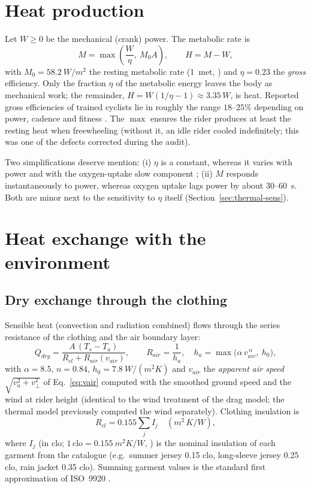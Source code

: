 \documentclass[11pt,a4paper]{article}
\begin{document}
\section{Heat production}
\label{sec:heatprod}
Let \(W\ge0\) be the mechanical (crank) power. The metabolic rate is
\begin{equation}
 M=\max\!\left(\frac{W}{\eta},\ M_0A\right),\qquad H=M-W,
 \label{eq:metab}
\end{equation}
with \(M_0=\SI{58.2}{W/m^2}\) the resting metabolic rate (1~met, \citealp{iso7730}) and \(\eta=0.23\) the \emph{gross} efficiency. Only the fraction \(\eta\) of the metabolic energy leaves the body as mechanical work; the remainder, \(H=W(1/\eta-1)\approx3.35\,W\), is heat. Reported gross efficiencies of trained cyclists lie in roughly the range \(18\)--\(25\%\) depending on power, cadence and fitness \citep{ettema2009}. The \(\max\) ensures the rider produces at least the resting heat when freewheeling (without it, an idle rider cooled indefinitely; this was one of the defects corrected during the audit).

Two simplifications deserve mention: (i) \(\eta\) is a constant, whereas it varies with power and with the oxygen-uptake slow component \citep{ettema2009}; (ii) \(M\) responds instantaneously to power, whereas oxygen uptake lags power by about \(30\)--\SI{60}{s}. Both are minor next to the sensitivity to \(\eta\) itself (Section~\ref{sec:thermal-sens}).

\section{Heat exchange with the environment}
\subsection{Dry exchange through the clothing}
\label{sec:dry}
Sensible heat (convection and radiation combined) flows through the series resistance of the clothing and the air boundary layer:
\begin{equation}
 Q_{dry}=\frac{A\,(T_s-T_a)}{R_{cl}+R_{air}(v_{air})},\qquad R_{air}=\frac{1}{h_a},\quad h_a=\max\bigl(\alpha\,v_{air}^{\,n},\ h_0\bigr),
 \label{eq:dry}
\end{equation}
with \(\alpha=8.5\), \(n=0.84\), \(h_0=\SI{7.8}{W/(m^2K)}\) and \(v_{air}\) the \emph{apparent air speed} \(\sqrt{v_a^2+v_\perp^2}\) of Eq.~\eqref{eq:vair} computed with the smoothed ground speed and the wind at rider height (identical to the wind treatment of the drag model; the thermal model previously computed the wind separately). Clothing insulation is
\begin{equation}
 R_{cl}=0.155\sum_j I_j\quad(\si{m^2\,K/W}),
\end{equation}
where \(I_j\) (in clo; \(1\,\mathrm{clo}=\SI{0.155}{m^2K/W}\), \citealp{gagge1941}) is the nominal insulation of each garment from the catalogue (e.g.\ summer jersey 0.15 clo, long-sleeve jersey 0.25 clo, rain jacket 0.35 clo). Summing garment values is the standard first approximation of ISO~9920 \citep{iso9920}.
\end{document}
